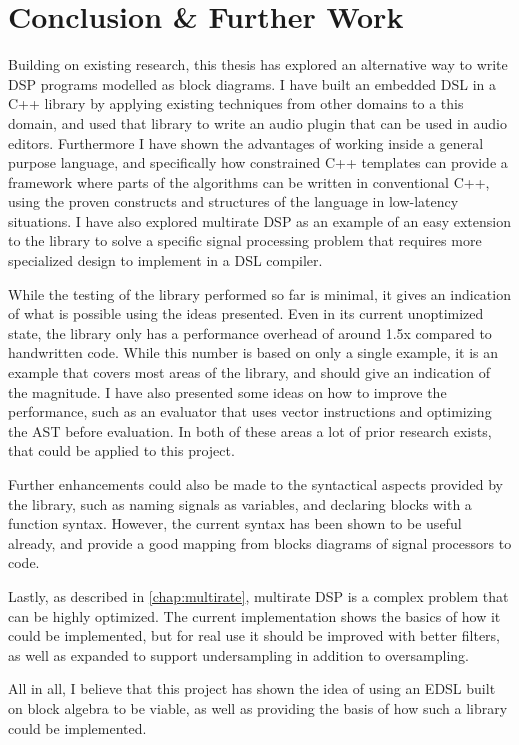 \chapter{Conclusion \& Further Work}

Building on existing research, this thesis has explored an alternative way to write DSP programs modelled as
block diagrams. I have built an embedded DSL in a C++ library by applying existing techniques from other
domains to a this domain, and used that library to write an audio plugin that can be used in audio editors.
Furthermore I have shown the advantages of working inside a general purpose language, and specifically how
constrained C++ templates can provide a framework where parts of the algorithms can be written in
conventional C++, using the proven constructs and structures of the language in low-latency situations. I
have also explored multirate DSP as an example of an easy extension to the library to solve a specific signal
processing problem that requires more specialized design to implement in a DSL compiler.

While the testing of the library performed so far is minimal, it gives an indication of what is possible
using the ideas presented. Even in its current unoptimized state, the library only has a performance overhead
of around 1.5x compared to handwritten code. While this number is based on only a single example, it is an
example that covers most areas of the library, and should give an indication of the magnitude. I have also
presented some ideas on how to improve the performance, such as an evaluator that uses vector instructions
and optimizing the AST before evaluation. In both of these areas a lot of prior research exists, that could
be applied to this project.

Further enhancements could also be made to the syntactical aspects provided by the library, such as naming
signals as variables, and declaring blocks with a function syntax. However, the current syntax has been shown
to be useful already, and provide a good mapping from blocks diagrams of signal processors to code.

Lastly, as described in \autoref{chap:multirate}, multirate DSP is a complex problem that can be highly
optimized. The current implementation shows the basics of how it could be implemented, but for real use it
should be improved with better filters, as well as expanded to support undersampling in addition to
oversampling.

All in all, I believe that this project has shown the idea of using an EDSL built on block algebra to be
viable, as well as providing the basis of how such a library could be implemented.

